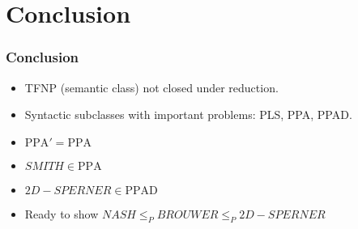 \documentclass[10pt]{beamer}
\begin{document}
\section{Conclusion}

\begin{frame}
\frametitle{Conclusion}

\begin{itemize}
\item TFNP (semantic class) not closed under reduction.
\item Syntactic subclasses with important problems: PLS, PPA, PPAD.
\item $\textrm{PPA}' = \textrm{PPA}$
\item $SMITH \in \textrm{PPA}$
\item $2D-SPERNER \in \textrm{PPAD}$
\item Ready to show $NASH \le_P BROUWER \le_P 2D-SPERNER$
\end{itemize}
\end{frame}
\end{document}
